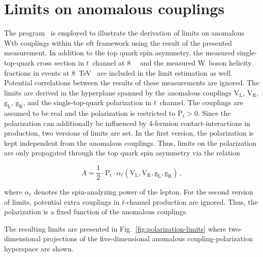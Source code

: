\section{Limits on anomalous couplings}

The \TOPFIT[format=hyperbf] program~\cite{AguilarSaavedra:2010nx,topfit} is employed to illustrate the derivation of limits on anomalous Wtb couplings within the \gls{eft} framework using the result of the presented measurement. In addition to the top quark spin asymmetry, the measured single-top-quark cross section in $t$~channel at 8~\TeV~\cite{Khachatryan:2014iya} and the measured W~boson helicity fractions in \ttbar events at 8~TeV~\cite{Khachatryan:2016fky} are included in the limit estimation as well. Potential correlations between the results of these measurements are ignored. The limits are derived in the hyperplane spanned by the anomalous couplings $\mathrm{V}_\mathrm{L}$, $\mathrm{V}_\mathrm{R}$, $\mathrm{g}_\mathrm{L}$, $\mathrm{g}_\mathrm{R}$, and the single-top-quark polarization in $t$~channel. The couplings are assumed to be real and the polarization is restricted to $\mathrm{P}_\mathrm{t}>0$. Since the polarization can additionally be influenced by 4-fermion contact-interactions in production, two versions of limits are set. In the first version, the polarization is kept independent from the anomalous couplings. Thus, limits on the polarization are only propagated through the top quark spin asymmetry via the relation

\begin{equation}
A=\frac{1}{2}\cdot\mathrm{P}_\mathrm{t}\cdot\alpha_{\ell}(\mathrm{V}_\mathrm{L},\mathrm{V}_\mathrm{R},\mathrm{g}_\mathrm{L},\mathrm{g}_\mathrm{R})\,,
\end{equation}

where $\alpha_{\ell}$ denotes the spin-analyzing power of the lepton. For the second version of limits, potential extra couplings in $t$-channel production are ignored. Thus, the polarization is a fixed function of the anomalous couplings. 

The resulting limits are presented in Fig.~\ref{fig:polarization-limits} where two-dimensional projections of the five-dimensional anomalous coupling-polarization hyperspace are shown.

